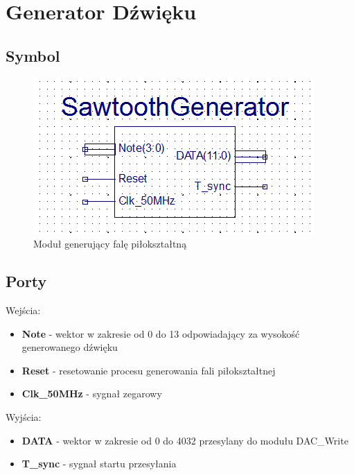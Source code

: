 \documentclass[a4paper]{report}
\begin{document}
	\section{Generator Dźwięku}
		\subsection{Symbol}
			\begin{figure}[h!]
				\centering
				\includegraphics{sawtoothgenerator2.png}
				\caption{Moduł generujący falę piłokształtną}
			\end{figure}
		\subsection{Porty}
		{\Large Wejścia:}
			\begin{itemize}	 
				\item \textbf{Note} - wektor w zakresie od 0 do 13 odpowiadający za wysokość generowanego dźwięku
				\item \textbf{Reset} - resetowanie procesu generowania fali piłokształtnej
				\item \textbf{Clk\_50MHz} - sygnał zegarowy
			\end{itemize}
		{\Large Wyjścia:}
			\begin{itemize} 
				\item \textbf{DATA} - wektor w zakresie od 0 do 4032 przesylany do modułu DAC\_Write
				\item \textbf{T\_sync} - sygnał startu przesyłania
			\end{itemize}
\end{document}
